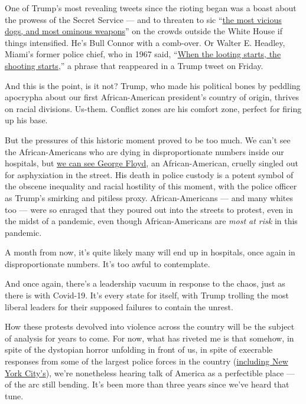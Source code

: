 One of Trump's most revealing tweets since the rioting began was a boast
about the prowess of the Secret Service --- and to threaten to sic
``\href{https://www.nytimes3xbfgragh.onion/2020/05/30/us/politics/trump-threatens-protesters-dogs-weapons.html?smtyp=cur\&smid=tw-nytimes}{the
most vicious dogs, and most ominous weapons}'' on the crowds outside the
White House if things intensified. He's Bull Connor with a comb-over. Or
Walter E. Headley, Miami's former police chief, who in 1967 said,
``\href{https://www.nytimes3xbfgragh.onion/2020/05/29/us/looting-starts-shooting-starts.html}{When
the looting starts, the shooting starts,}'' a phrase that reappeared in
a Trump tweet on Friday.

And this is the point, is it not? Trump, who made his political bones by
peddling apocrypha about our first African-American president's country
of origin, thrives on racial divisions. Us-them. Conflict zones are his
comfort zone, perfect for firing up his base.

But the pressures of this historic moment proved to be too much. We
can't see the African-Americans who are dying in disproportionate
numbers inside our hospitals, but
\href{https://www.youtube.com/watch?v=61QNgIVj9mI\&bpctr=1590953361}{we
can see George Floyd}, an African-American, cruelly singled out for
asphyxiation in the street. His death in police custody is a potent
symbol of the obscene inequality and racial hostility of this moment,
with the police officer as Trump's smirking and pitiless proxy.
African-Americans --- and many whites too --- were so enraged that they
poured out into the streets to protest, even in the midst of a pandemic,
even though African-Americans are \emph{most at risk} in this pandemic.

A month from now, it's quite likely many will end up in hospitals, once
again in disproportionate numbers. It's too awful to contemplate.

And once again, there's a leadership vacuum in response to the chaos,
just as there is with Covid-19. It's every state for itself, with Trump
trolling the most liberal leaders for their supposed failures to contain
the unrest.

How these protests devolved into violence across the country will be the
subject of analysis for years to come. For now, what has riveted me is
that somehow, in spite of the dystopian horror unfolding in front of us,
in spite of execrable responses from some of the largest police forces
in the country
(\href{https://twitter.com/samdolnick/status/1266893561481568263}{including
New York City's}), we're nonetheless hearing talk of America as a
perfectible place --- of the arc still bending. It's been more than
three years since we've heard that tune.

